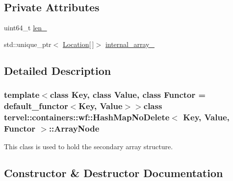 \subsection*{Private Attributes}
\begin{DoxyCompactItemize}
\item 
uint64\+\_\+t \hyperlink{classtervel_1_1containers_1_1wf_1_1_hash_map_no_delete_1_1_array_node_a5f281eee813a9ccf8357399782bde1a3}{len\+\_\+}
\item 
std\+::unique\+\_\+ptr$<$ \hyperlink{classtervel_1_1containers_1_1wf_1_1_hash_map_no_delete_af5b18c3806eb5b2d39693075d8c70ade}{Location}\mbox{[}$\,$\mbox{]}$>$ \hyperlink{classtervel_1_1containers_1_1wf_1_1_hash_map_no_delete_1_1_array_node_a7856c599048010921c610f1b6c5ef6e7}{internal\+\_\+array\+\_\+}
\end{DoxyCompactItemize}


\subsection{Detailed Description}
\subsubsection*{template$<$class Key, class Value, class Functor = default\+\_\+functor$<$\+Key, Value$>$$>$class tervel\+::containers\+::wf\+::\+Hash\+Map\+No\+Delete$<$ Key, Value, Functor $>$\+::\+Array\+Node}

This class is used to hold the secondary array structure. 

\subsection{Constructor \& Destructor Documentation}
\hypertarget{classtervel_1_1containers_1_1wf_1_1_hash_map_no_delete_1_1_array_node_ac45e67621163d45bf45f5bcc0b6f39f4}{}
